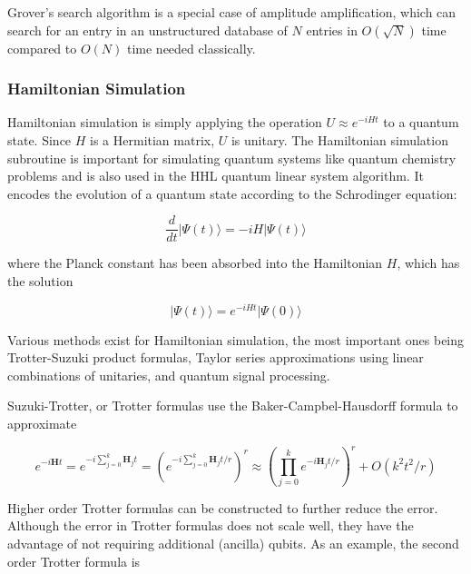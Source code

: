 \documentclass{article}
\begin{document}
Grover's search algorithm is a special case of amplitude amplification, which can search for an entry in an unstructured database of $N$ entries in $O(\sqrt{N})$ time compared to $O(N)$ time needed classically.





\subsubsection{Hamiltonian Simulation}

Hamiltonian simulation is simply applying the operation $U \approx e^{-iHt}$ to a quantum state. Since $H$ is a Hermitian matrix, $U$ is unitary. The Hamiltonian simulation subroutine is important for simulating quantum systems like quantum chemistry problems and is also used in the HHL quantum linear system algorithm. It encodes the evolution of a quantum state according to the Schrodinger equation:

\begin{equation}
\frac{d}{dt} \lvert \Psi(t) \rangle = -i H \lvert \Psi(t) \rangle
\end{equation}

where the Planck constant has been absorbed into the Hamiltonian $H$, which has the solution

\begin{equation}
\lvert \Psi (t) \rangle = e^{-iHt} \lvert \Psi(0) \rangle
\end{equation}

Various methods exist for Hamiltonian simulation, the most important ones being Trotter-Suzuki product formulas, Taylor series approximations using linear combinations of unitaries, and quantum signal processing.

Suzuki-Trotter, or Trotter formulas use the Baker-Campbel-Hausdorff formula to approximate

\begin{equation}
e^{-i \mathbf{H} t} = e^{ -i \sum_{j=0}^{k}\mathbf{H}_j t } = (e^{ -i \sum_{j=0}^{k}\mathbf{H}_j t / r})^r \approx   (\prod_{j=0}^{k} e^{-i \mathbf{H}_j t / r })^r + O(k^2 t^2 / r)
\end{equation}


Higher order Trotter formulas can be constructed to further reduce the error. Although the error in Trotter formulas does not scale well, they have the advantage of not requiring additional (ancilla) qubits. As an example, the second order Trotter formula is
\end{document}
